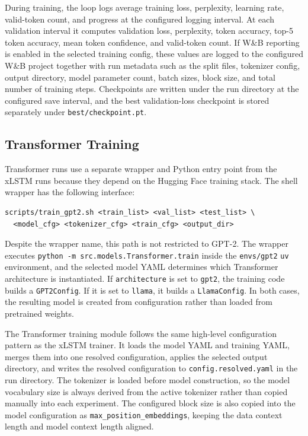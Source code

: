 During training, the loop logs average training loss, perplexity, learning rate, valid-token count, and progress at the configured logging interval. At each validation interval it computes validation loss, perplexity, token accuracy, top-5 token accuracy, mean token confidence, and valid-token count. If W\&B \citep{wandb} reporting is enabled in the selected training config, these values are logged to the configured W\&B project together with run metadata such as the split files, tokenizer config, output directory, model parameter count, batch sizes, block size, and total number of training steps. Checkpoints are written under the run directory at the configured save interval, and the best validation-loss checkpoint is stored separately under \verb|best/checkpoint.pt|.

\subsection{Transformer Training}

Transformer runs use a separate wrapper and Python entry point from the xLSTM
runs because they depend on the Hugging Face training stack. The shell wrapper
has the following interface:
\begin{verbatim}
scripts/train_gpt2.sh <train_list> <val_list> <test_list> \
  <model_cfg> <tokenizer_cfg> <train_cfg> <output_dir>
\end{verbatim}
Despite the wrapper name, this path is not restricted to GPT-2. The wrapper
executes \verb|python -m src.models.Transformer.train| inside the
\verb|envs/gpt2| \verb|uv| environment, and the selected model YAML determines
which Transformer architecture is instantiated. If \verb|architecture| is set to
\verb|gpt2|, the training code builds a \verb|GPT2Config|. If it is set to
\verb|llama|, it builds a \verb|LlamaConfig|. In both cases, the resulting model
is created from configuration rather than loaded from pretrained weights.

The Transformer training module follows the same high-level configuration
pattern as the xLSTM trainer. It loads the model YAML and training YAML, merges
them into one resolved configuration, applies the selected output directory, and
writes the resolved configuration to \verb|config.resolved.yaml| in the run
directory. The tokenizer is loaded before model construction, so the model
vocabulary size is always derived from the active tokenizer rather than copied
manually into each experiment. The configured block size is also copied into the
model configuration as \verb|max_position_embeddings|, keeping the data context
length and model context length aligned.

